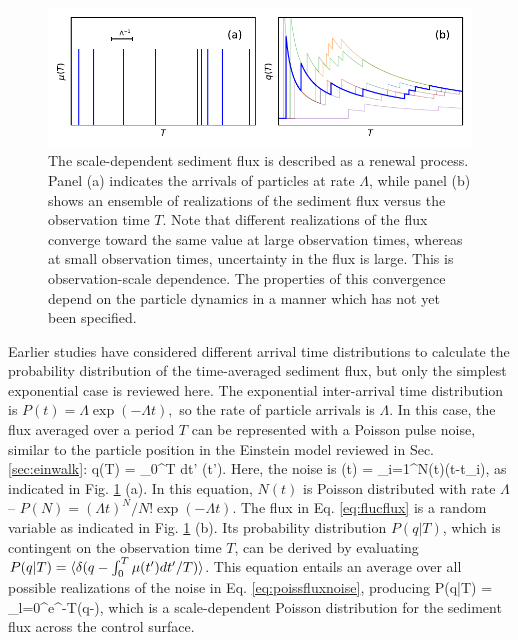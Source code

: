  \begin{figure}[!htbp]
	\includegraphics[width=\linewidth,keepaspectratio]{./figures/ch1/anceyRenewal.pdf}
	\caption{The scale-dependent sediment flux is described as a renewal process. Panel (a) indicates the arrivals of particles at rate $\Lambda$, while panel (b) shows an ensemble of realizations of the sediment flux versus the observation time $T$. Note that different realizations of the flux converge toward the same value at large observation times, whereas at small observation times, uncertainty in the flux is large. This is observation-scale dependence. The properties of this convergence depend on the particle dynamics in a manner which has not yet been specified. }
	\label{fig:ancey}
\end{figure}
Earlier studies have considered different arrival time distributions to calculate the probability distribution of the time-averaged sediment flux, but only the simplest exponential case is reviewed here. The exponential inter-arrival time distribution is $P(t) = \Lambda \exp(-\Lambda t),$ so the rate of particle arrivals is $\Lambda$.
In this case, the flux averaged over a period $T$ can be represented with a Poisson pulse noise, similar to the particle position in the Einstein model reviewed in Sec. \ref{sec:einwalk}:
\be q(T) = \int_0^T dt' \mu(t'). \label{eq:flucflux}\ee
Here, the noise is 
\be \mu(t) = \sum_{i=1}^{N(t)}\delta(t-t_i), \label{eq:poissfluxnoise}\ee
as indicated in Fig. \ref{fig:ancey} (a). In this equation, $N(t)$ is Poisson distributed with rate $\Lambda$ -- $P(N)=(\Lambda t)^N/N! \exp(-\Lambda t).$
The flux in Eq. \ref{eq:flucflux} is a random variable as indicated in Fig. \ref{fig:ancey} (b). Its probability distribution $P(q|T)$, which is contingent on the observation time $T$, can be derived by evaluating $P(q|T) = \langle \delta(q-\int_0^T \mu(t') dt'/T) \rangle$.
This equation entails an average over all possible realizations of the noise in Eq. \ref{eq:poissfluxnoise}, producing \citep{VanKampen2007}
\be P(q|T) = \sum_{l=0}^\infty {}e^{-\Lambda T}\delta(q-),\ee
which is a scale-dependent Poisson distribution for the sediment flux across the control surface.

